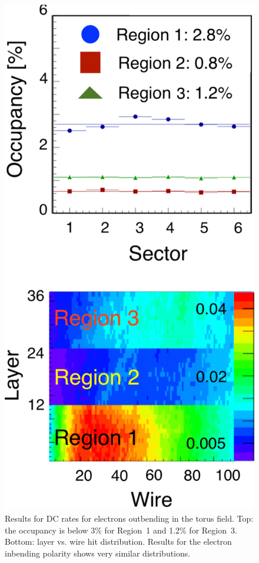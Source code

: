 \begin{figure}
	\centering
	\includegraphics[width=0.99\columnwidth,keepaspectratio]{img/dcOccupancy.png}
	\caption{Results for DC rates for electrons outbending in the torus field. Top: the occupancy is below 3\% for
          Region~1 and 1.2\% for Region~3. Bottom: layer vs. wire hit distribution. Results for the electron inbending
          polarity shows very similar distributions.}
	\label{fig:dcOccupancy}
\end{figure}

